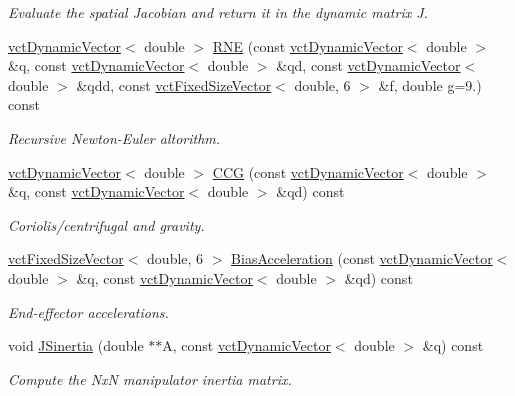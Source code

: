 \begin{DoxyCompactItemize}
\begin{DoxyCompactList}\small\item\em Evaluate the spatial Jacobian and return it in the dynamic matrix J. \end{DoxyCompactList}\item 
\hyperlink{classvct_dynamic_vector}{vct\+Dynamic\+Vector}$<$ double $>$ \hyperlink{classrob_manipulator_a3994fc004c5387ad68f3112aab37b907}{R\+N\+E} (const \hyperlink{classvct_dynamic_vector}{vct\+Dynamic\+Vector}$<$ double $>$ \&q, const \hyperlink{classvct_dynamic_vector}{vct\+Dynamic\+Vector}$<$ double $>$ \&qd, const \hyperlink{classvct_dynamic_vector}{vct\+Dynamic\+Vector}$<$ double $>$ \&qdd, const \hyperlink{classvct_fixed_size_vector}{vct\+Fixed\+Size\+Vector}$<$ double, 6 $>$ \&f, double g=9.) const 
\begin{DoxyCompactList}\small\item\em Recursive Newton-\/\+Euler altorithm. \end{DoxyCompactList}\item 
\hyperlink{classvct_dynamic_vector}{vct\+Dynamic\+Vector}$<$ double $>$ \hyperlink{classrob_manipulator_a2bab22615d2306c98984a3e2ef1dc729}{C\+C\+G} (const \hyperlink{classvct_dynamic_vector}{vct\+Dynamic\+Vector}$<$ double $>$ \&q, const \hyperlink{classvct_dynamic_vector}{vct\+Dynamic\+Vector}$<$ double $>$ \&qd) const 
\begin{DoxyCompactList}\small\item\em Coriolis/centrifugal and gravity. \end{DoxyCompactList}\item 
\hyperlink{classvct_fixed_size_vector}{vct\+Fixed\+Size\+Vector}$<$ double, 6 $>$ \hyperlink{classrob_manipulator_abd760ec964b192696e621ee58618098e}{Bias\+Acceleration} (const \hyperlink{classvct_dynamic_vector}{vct\+Dynamic\+Vector}$<$ double $>$ \&q, const \hyperlink{classvct_dynamic_vector}{vct\+Dynamic\+Vector}$<$ double $>$ \&qd) const 
\begin{DoxyCompactList}\small\item\em End-\/effector accelerations. \end{DoxyCompactList}\item 
void \hyperlink{classrob_manipulator_a98c6df79e3838790007a0de10a1a453a}{J\+Sinertia} (double $\ast$$\ast$A, const \hyperlink{classvct_dynamic_vector}{vct\+Dynamic\+Vector}$<$ double $>$ \&q) const 
\begin{DoxyCompactList}\small\item\em Compute the Nx\+N manipulator inertia matrix. \end{DoxyCompactList}\item 
$$
\end{DoxyCompactItemize}
